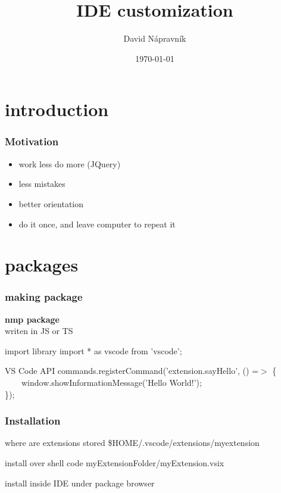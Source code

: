 \documentclass{beamer}
\title[Short title]{IDE customization} %
\author{David Nápravník} %
\institute[mff] %
{
Charles University \\ %
\medskip
\textit{ebrithil@nogare.cz} %
}
\date{\today} %
\begin{document}
\begin{frame}
\titlepage %
\end{frame}


\section{introduction}

\begin{frame}
\frametitle{Motivation}
\begin{itemize}
\item work less do more (JQuery)
\item less mistakes
\item better orientation
\item do it once, and leave computer to repeat it
\end{itemize}
\end{frame}


\section{packages}
\begin{frame}
\frametitle{making package}
\textbf{nmp package}\\
writen in JS or TS
\begin{block}{import library}
import * as vscode from 'vscode';
\end{block}

\begin{block}{VS Code API}
commands.registerCommand('extension.sayHello', () =$>$ \{\\
~~~~window.showInformationMessage('Hello World!');\\
\});
\end{block}
\end{frame}

\begin{frame}
\frametitle{Installation}
\begin{block}{where are extensions stored}
\$HOME/.vscode/extensions/myextension
\end{block}
\begin{block}{install over shell}
code myExtensionFolder/myExtension.vsix
\end{block}
install inside IDE under package browser
\end{frame}
\end{document}
